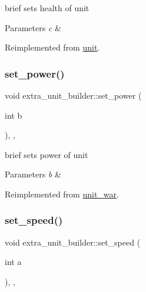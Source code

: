 brief sets health of unit 
\begin{DoxyParams}{Parameters}
{\em c} & \\
\hline
\end{DoxyParams}


Reimplemented from \mbox{\hyperlink{classunit_a1dabc406074919750b1c606496e8e42d}{unit}}.

\mbox{\label{classextra__unit__builder_a98602fd267039102bd6b431bdf5b658d}} 
\subsubsection{\texorpdfstring{set\+\_\+power()}{set\_power()}}
{\footnotesize\ttfamily void extra\+\_\+unit\+\_\+builder\+::set\+\_\+power (\begin{DoxyParamCaption}\item[{int}]{b }\end{DoxyParamCaption})\hspace{0.3cm}{\ttfamily [inline]}, {\ttfamily [override]}, {\ttfamily [virtual]}}

brief sets power of unit 
\begin{DoxyParams}{Parameters}
{\em b} & \\
\hline
\end{DoxyParams}


Reimplemented from \mbox{\hyperlink{classunit__war_a8ea09eb3e352d5a3b2d7611ac78124a2}{unit\+\_\+war}}.

\mbox{\label{classextra__unit__builder_aa95d6dcfba85a06592d6725baebd51cc}} 
\subsubsection{\texorpdfstring{set\+\_\+speed()}{set\_speed()}}
{\footnotesize\ttfamily void extra\+\_\+unit\+\_\+builder\+::set\+\_\+speed (\begin{DoxyParamCaption}\item[{int}]{a }\end{DoxyParamCaption})\hspace{0.3cm}{\ttfamily [inline]}, {\ttfamily [override]}, {\ttfamily [virtual]}}

